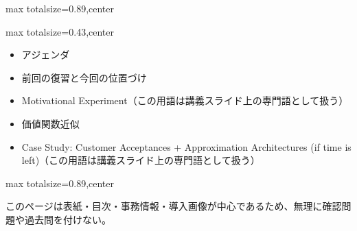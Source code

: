 \begin{minipage}[t]{0.58\textwidth}
\begin{adjustbox}{max totalsize={\textwidth}{0.89\textheight},center}
\begin{minipage}{\textwidth}
\end{minipage}
\end{adjustbox}
\end{minipage}


\clearpage
{}
\begin{minipage}[t]{0.405\textwidth}
\begin{adjustbox}{max totalsize={\textwidth}{0.43\textheight},center}
\begin{minipage}{\textwidth}\scriptsize
{}\begin{itemize}
\item アジェンダ
\item 前回の復習と今回の位置づけ
\item Motivational Experiment（この用語は講義スライド上の専門語として扱う）
\item 価値関数近似
\item Case Study: Customer Acceptances + Approximation Architectures (if time is left)（この用語は講義スライド上の専門語として扱う）
\end{itemize}
\end{minipage}
\end{adjustbox}
\end{minipage}\hfill
\begin{minipage}[t]{0.58\textwidth}
\begin{adjustbox}{max totalsize={\textwidth}{0.89\textheight},center}
\begin{minipage}{\textwidth}\scriptsize
{}このページは表紙・目次・事務情報・導入画像が中心であるため、無理に確認問題や過去問を付けない。
\end{minipage}
\end{adjustbox}
\end{minipage}


